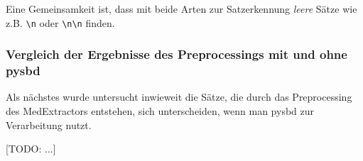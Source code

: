 Eine Gemeinsamkeit ist, dass mit beide Arten zur Satzerkennung \emph{leere} Sätze wie z.B. \verb!\n! oder \verb!\n!\verb!\n! finden.

\subsubsection{Vergleich der Ergebnisse des Preprocessings mit und ohne pysbd}

Als nächstes wurde untersucht inwieweit die Sätze, die durch das Preprocessing des MedExtractors entstehen, sich unterscheiden, wenn man pysbd zur Verarbeitung nutzt.

[TODO: ...]

